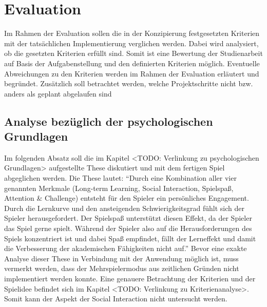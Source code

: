 
\section{Evaluation}
    Im Rahmen der Evaluation sollen die in der Konzipierung festgesetzten Kriterien mit der tatsächlichen Implementierung verglichen werden. Dabei wird analysiert, ob die gesetzten Kriterien erfüllt sind. Somit ist eine Bewertung der Studienarbeit auf Basis der Aufgabenstellung und den definierten Kriterien möglich. 
    Eventuelle Abweichungen zu den Kriterien werden im Rahmen der Evaluation erläutert und begründet. Zusätzlich soll betrachtet werden, welche  Projektschritte nicht bzw. anders als geplant abgelaufen sind

\subsection{Analyse bezüglich der psychologischen Grundlagen}
Im folgenden Absatz soll die im Kapitel <TODO: Verlinkung zu psychologischen Grundlagen> aufgestellte These diskutiert und mit dem fertigen Spiel abgeglichen werden. Die These lautet:
\enquote{Durch eine Kombination aller vier genannten Merkmale (Long-term Learning, Social Interaction, Spielspaß, Attention \& Challenge) entsteht für den Spieler ein persönliches Engagement. Durch die Lernkurve und den ansteigenden Schwierigkeitsgrad fühlt sich der Spieler herausgefordert. Der Spielspaß unterstützt diesen Effekt, da der Spieler das Spiel gerne spielt. Während der Spieler also auf die Herausforderungen des Spiels konzentriert ist und dabei Spaß empfindet, fällt der Lerneffekt und damit die Verbesserung der akademischen Fähigkeiten nicht auf.}
Bevor eine exakte Analyse dieser These in Verbindung mit der Anwendung möglich ist, muss vermerkt werden, dass der Mehrspielermodus aus zeitlichen Gründen nicht implementiert werden konnte. Eine genauere Betrachtung der Kriterien und der Spielidee befindet sich im Kapitel <TODO: Verlinkung zu Kriterienanalyse>. Somit kann der Aspekt der Social Interaction nicht untersucht werden.
